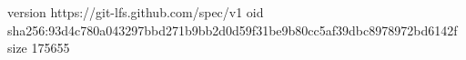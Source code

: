 version https://git-lfs.github.com/spec/v1
oid sha256:93d4c780a043297bbd271b9bb2d0d59f31be9b80cc5af39dbc8978972bd6142f
size 175655
